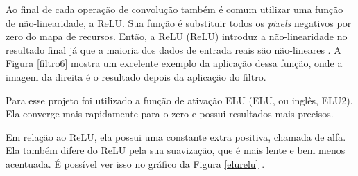 Ao final de cada operação de convolução também é comum utilizar uma função de não-linearidade, a ReLU. Sua função é substituir todos os \textit{pixels} negativos por zero do mapa de recursos. Então, a \acrlong{ReLU} (ReLU) introduz a não-linearidade no resultado final já que a maioria dos dados de entrada reais são não-lineares \cite{conv2}.
A Figura \ref{filtro6} mostra um excelente exemplo da aplicação dessa função, onde a imagem da direita é o resultado depois da aplicação do filtro.

\begin{figure}[H]
	\centering
\end{figure}

Para esse projeto foi utilizado a função de ativação ELU (\acrlong{ELU}, ou inglês, \acrlong{ELU2}). Ela converge mais rapidamente para o zero e possui resultados mais precisos.

Em relação ao ReLU, ela possui uma constante extra positiva, chamada de alfa. Ela também difere do ReLU pela sua suavização, que é mais lente e bem menos acentuada. É possível ver isso no gráfico da Figura \ref{elurelu} \cite{elu}.

\begin{figure}[H]
	\centering
\end{figure}

